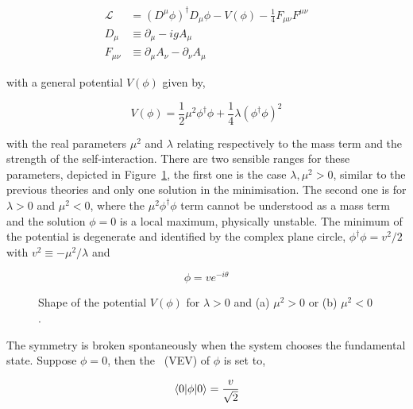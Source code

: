 \begin{equation}
    \begin{split}
    \mathcal{L}_{\ \ }&=(D^\mu\phi)^\dag D_\mu\phi - V(\phi) - \frac{1}{4}F_{\mu\nu}F^{\mu\nu}\\
    D_{\mu \ } &\equiv \partial_\mu - igA_\mu\\
    F_{\mu\nu}&\equiv\partial_\mu A_\nu - \partial_\nu A_\mu
    \end{split}
\end{equation}

with a general potential $V(\phi)$ given by,

\begin{equation}
    V(\phi) = \frac{1}{2}\mu^2\phi^\dag\phi + \frac{1}{4}\lambda(\phi^\dag\phi)^2
\end{equation}

with the real parameters $\mu^2$ and $\lambda$ relating respectively to the mass term and the strength of the self-interaction.
There are two sensible ranges for these parameters, depicted in Figure~\ref{figSM:higgspotential}, the first one is the case $\lambda,\mu^2>0$,
similar to the previous theories and only one solution in the minimisation.
The second one is for $\lambda>0$ and $\mu^2<0$, where the $\mu^2\phi^\dag\phi$ term cannot be understood as a mass term and
the solution $\phi=0$ is a local maximum, physically unstable. The minimum of the potential is degenerate and identified by the complex
plane circle, $\phi^\dag\phi=v^2/2$ with $v^2\equiv-\mu^2/\lambda$ and

\begin{equation}
    \phi = v e^{-i\theta}
\end{equation}

\begin{figure}[htbp]
    \RawFloats
    \begin{center}
    \qquad
    \caption{Shape of the potential $V(\phi)$ for $\lambda>0$ and (a) $\mu^2>0$ or (b) $\mu^2<0$.
    }
    \label{figSM:higgspotential}
    \end{center}
\end{figure}

The symmetry is broken spontaneously when the system chooses the fundamental state. Suppose $\phi=0$, then the \textit{}~(\acrshort{VEV})
of $\phi$ is set to,

\begin{equation}
    \expval{\phi}{0} = \frac{v}{\sqrt{2}}
\end{equation}

